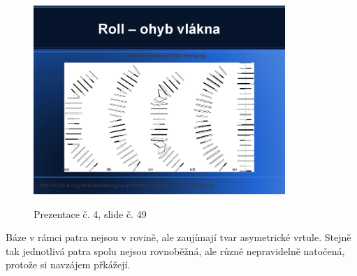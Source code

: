 \documentclass[DIV=8]{scrreprt}
\begin{document}
\begin{figure}
    \caption{Prezentace č. 4, slide č. 49}
    \includegraphics[width=0.85\textwidth]{slides-4/slide-49.jpg}
    \centering
    \label{slides-4-slide-49}
\end{figure}
 Báze v rámci patra nejsou v rovině, ale zaujímají tvar asymetrické vrtule. Stejně tak jednotlivá patra spolu nejsou rovnoběžná, ale různě nepravidelně natočená, protože si navzájem přkážejí.
\end{document}
